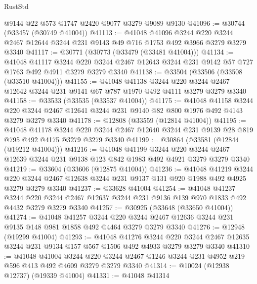 \begin{lexlean}{RustStd}
\begin{coremodule}
    @9144
    @22
    @573
    @1747
    @2420
    @9077
    @3279
    @9089
    @9130
@41096 := @30744 (@33457 (@30749 @41004))
@41113 := @41048
    @41096
    @3244
    @220
    @3244
    @2467
    @12644
    @3244
    @231
    @9143
    @49
    @716
    @1753
    @492
    @3966
    @3279
    @3279
    @3340
@41117 := @30771 (@30773 (@33479 (@33481 @41004)))
@41134 := @41048
    @41117
    @3244
    @220
    @3244
    @2467
    @12643
    @3244
    @231
    @9142
    @57
    @727
    @1763
    @492
    @4911
    @3279
    @3279
    @3340
@41138 := @33504 (@33506 (@33508 (@33510 @41004)))
@41155 := @41048
    @41138
    @3244
    @220
    @3244
    @2467
    @12642
    @3244
    @231
    @9141
    @67
    @787
    @1970
    @492
    @4111
    @3279
    @3279
    @3340
@41158 := @33533 (@33535 (@33537 @41004))
@41175 := @41048
    @41158
    @3244
    @220
    @3244
    @2467
    @12641
    @3244
    @231
    @9140
    @82
    @800
    @1976
    @492
    @4143
    @3279
    @3279
    @3340
@41178 := @12808 (@33559 (@12814 @41004))
@41195 := @41048
    @41178
    @3244
    @220
    @3244
    @2467
    @12640
    @3244
    @231
    @9139
    @28
    @819
    @795
    @492
    @4175
    @3279
    @3279
    @3340
@41199 := @30864 (@33581 (@12844 (@19212 @41004)))
@41216 := @41048
    @41199
    @3244
    @220
    @3244
    @2467
    @12639
    @3244
    @231
    @9138
    @123
    @842
    @1983
    @492
    @4921
    @3279
    @3279
    @3340
@41219 := @33604 (@33606 (@12875 @41004))
@41236 := @41048
    @41219
    @3244
    @220
    @3244
    @2467
    @12638
    @3244
    @231
    @9137
    @131
    @920
    @1988
    @492
    @4925
    @3279
    @3279
    @3340
@41237 := @33628 @41004
@41254 := @41048
    @41237
    @3244
    @220
    @3244
    @2467
    @12637
    @3244
    @231
    @9136
    @139
    @970
    @1833
    @492
    @4432
    @3279
    @3279
    @3340
@41257 := @30925 (@33648 (@33650 @41004))
@41274 := @41048
    @41257
    @3244
    @220
    @3244
    @2467
    @12636
    @3244
    @231
    @9135
    @148
    @981
    @1858
    @492
    @4464
    @3279
    @3279
    @3340
@41276 := @12948 (@19299 @41004)
@41293 := @41048
    @41276
    @3244
    @220
    @3244
    @2467
    @12635
    @3244
    @231
    @9134
    @157
    @567
    @1506
    @492
    @4933
    @3279
    @3279
    @3340
@41310 := @41048
    @41004
    @3244
    @220
    @3244
    @2467
    @1246
    @3244
    @231
    @4952
    @219
    @596
    @413
    @492
    @4609
    @3279
    @3279
    @3340
@41314 := @10024 (@12938 @12737) (@19339 @41004)
@41331 := @41048
    @41314

\end{coremodule}
\end{lexlean}
